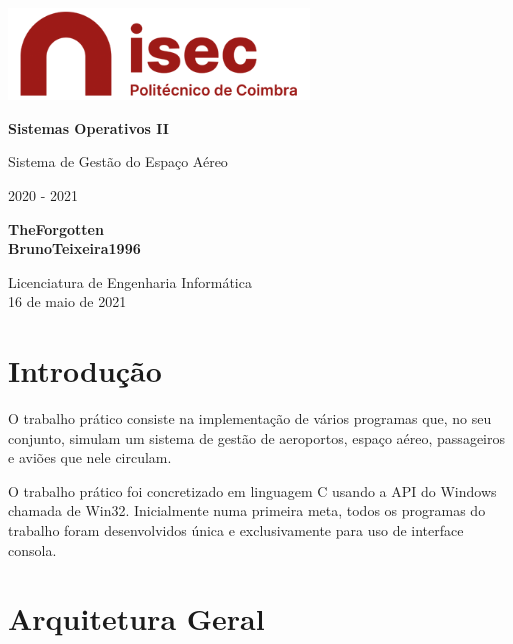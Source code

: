 \documentclass[11pt]{article}
\begin{document}
	\begin{titlepage}
    	\begin{center}
    		\includegraphics[width=0.6\textwidth]{logo-isec}
    		
    		\vspace*{\fill}
    		
    		\Huge
    		\textbf{Sistemas Operativos II}
    		
    		\huge
    		Sistema de Gestão do Espaço Aéreo
    		
    		\vspace{0.5cm}
    		\LARGE
    		2020 - 2021
    		
    		\vspace{1.5cm}
    		
    		\textbf{TheForgotten\\BrunoTeixeira1996}
    		
    		\vfill
    		\vspace*{\fill}
    		
    		\normalsize
    		Licenciatura de Engenharia Informática \\
    		16 de maio de 2021		
    	\end{center}
    \end{titlepage}
	
	\tableofcontents
	\pagebreak
	
	\large
	\section{Introdução}
	\normalsize
	
	O trabalho prático consiste na implementação de vários programas que, no seu conjunto, simulam um sistema de gestão de aeroportos, espaço aéreo, passageiros e aviões que nele circulam.
	
	O trabalho prático foi concretizado em linguagem C usando a API do Windows chamada de Win32. Inicialmente numa primeira meta, todos os programas do trabalho foram desenvolvidos única e exclusivamente para uso de interface consola.
    
    
	\large
	\section{Arquitetura Geral}
	\normalsize
	
\end{document}
